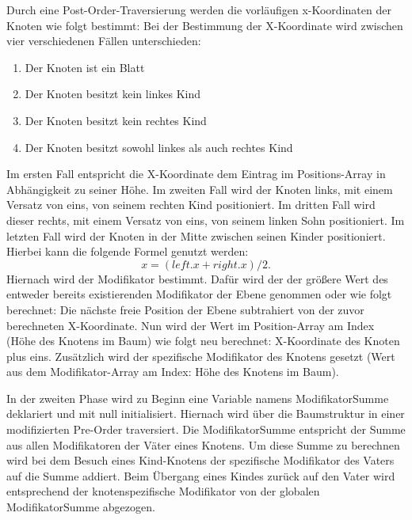 Durch eine Post-Order-Traversierung werden die vorläufigen x-Koordinaten der Knoten wie folgt bestimmt:
Bei der Bestimmung der X-Koordinate wird zwischen vier verschiedenen Fällen unterschieden:
\begin{enumerate}
	\item Der Knoten ist ein Blatt
	\item Der Knoten besitzt kein linkes Kind
	\item Der Knoten besitzt kein rechtes Kind
	\item Der Knoten besitzt sowohl linkes als auch rechtes Kind
\end{enumerate}

Im ersten Fall entspricht die X-Koordinate dem Eintrag im Positions-Array in Abhängigkeit zu seiner Höhe.
Im zweiten Fall wird der Knoten links, mit einem Versatz von eins, von seinem rechten Kind positioniert.
Im dritten Fall wird dieser rechts, mit einem Versatz von eins, von seinem linken Sohn positioniert. Im letzten Fall wird der Knoten
in der Mitte zwischen seinen Kinder positioniert. Hierbei kann die folgende Formel genutzt werden: $$x = (left.x + right.x) / 2.$$
Hiernach wird der Modifikator bestimmt. Dafür wird der der größere Wert des entweder bereits existierenden Modifikator der Ebene genommen
oder wie folgt berechnet: Die nächste freie Position der Ebene subtrahiert von der zuvor berechneten X-Koordinate.
Nun wird der Wert im Position-Array am Index (Höhe des Knotens im Baum) wie folgt neu berechnet:
X-Koordinate des Knoten plus eins. Zusätzlich wird der spezifische Modifikator des Knotens gesetzt
(Wert aus dem Modifikator-Array am Index: Höhe des Knotens im Baum).

In der zweiten Phase wird zu Beginn eine Variable namens \glqq ModifikatorSumme\grqq{} deklariert und mit null initialisiert.
Hiernach wird über die Baumstruktur in einer modifizierten Pre-Order traversiert. Die ModifikatorSumme entspricht
der Summe aus allen Modifikatoren der Väter eines Knotens. Um diese Summe zu berechnen wird bei dem Besuch eines Kind-Knotens
der spezifische Modifikator des Vaters auf die Summe addiert. Beim Übergang eines Kindes zurück auf den Vater wird entsprechend
der knotenspezifische Modifikator von der globalen ModifikatorSumme abgezogen.

